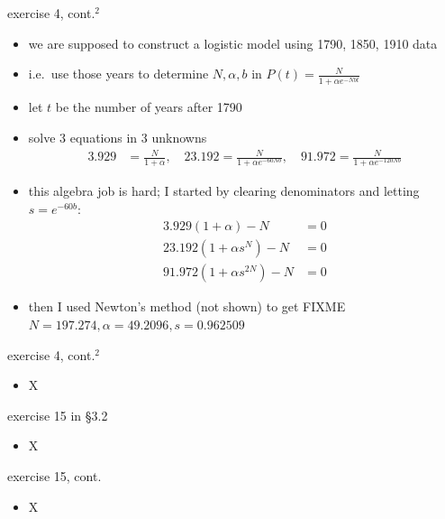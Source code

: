 \documentclass{beamer}
\begin{document}
\begin{frame}{exercise 4, cont.$^2$}

\begin{itemize}
\item we are supposed to construct a logistic model using 1790, 1850, 1910 data
\item i.e.~use those years to determine $N,\alpha,b$ in $P(t) = \frac{N}{1 + \alpha e^{-Nbt}}$
\item let $t$ be the number of years after 1790
\item solve 3 equations in 3 unknowns
\small
\begin{align*}
3.929 &= \frac{N}{1 + \alpha}, \quad 23.192 = \frac{N}{1 + \alpha e^{-60 Nb}}, \quad 91.972 = \frac{N}{1 + \alpha e^{-120 Nb}}
\end{align*}
\normalsize
\item this algebra job is hard; I started by clearing denominators and letting $s=e^{-60b}$:
\small
\begin{align*}
3.929 (1+\alpha) - N &= 0 \\
23.192 (1 + \alpha s^N) - N &= 0 \\
91.972 (1 + \alpha s^{2N}) - N &= 0
\end{align*}
\item then I used Newton's method (not shown) to get FIXME $N=197.274, \alpha=49.2096, s=0.962509$
\end{itemize}
\end{frame}


\begin{frame}{exercise 4, cont.$^2$}

\begin{itemize}
\item X
\end{itemize}
\end{frame}


\begin{frame}{exercise 15 in \S3.2}

\begin{itemize}
\item X
\end{itemize}
\end{frame}


\begin{frame}{exercise 15, cont.}

\begin{itemize}
\item X
\end{itemize}
\end{frame}
\end{document}
